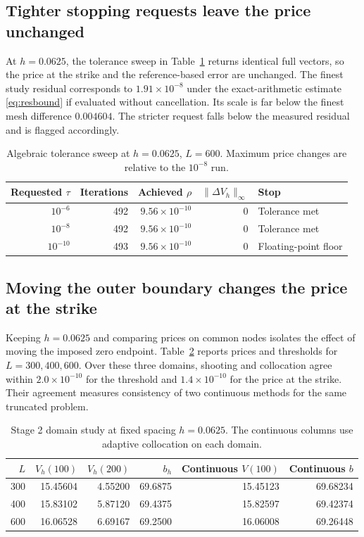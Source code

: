 \documentclass[11pt,a4paper]{article}
\numberwithin{equation}{section}
\begin{document}
\subsection{Tighter stopping requests leave the price unchanged}
At $h=0.0625$, the tolerance sweep in Table~\ref{tab:tolerance} returns
identical full vectors, so the price at the strike and the
reference-based error are unchanged. The finest study residual
corresponds to $1.91\times10^{-8}$ under the exact-arithmetic estimate
\eqref{eq:resbound} if evaluated without cancellation. Its scale is
far below the finest mesh difference $0.004604$.
The stricter request falls below the measured residual and is
flagged accordingly.

\begin{table}[htbp]
\centering\small
\caption{Algebraic tolerance sweep at $h=0.0625$, $L=600$.
Maximum price changes are relative to the $10^{-8}$ run.}
\label{tab:tolerance}
\begin{tabular}{@{}rrrrl@{}}
\toprule
Requested $\tau$ & Iterations & Achieved $\rho$ & $\|\Delta V_h\|_\infty$ & Stop\\
\midrule
$10^{-6}$ & 492 & $9.56\times10^{-10}$ & 0 & Tolerance met\\
$10^{-8}$ & 492 & $9.56\times10^{-10}$ & 0 & Tolerance met\\
$10^{-10}$ & 493 & $9.56\times10^{-10}$ & 0 & Floating-point floor\\
\bottomrule
\end{tabular}
\end{table}

\subsection{Moving the outer boundary changes the price at the strike}
Keeping $h=0.0625$ and comparing prices on common nodes isolates the
effect of moving the imposed zero endpoint. Table~\ref{tab:domain}
reports prices and thresholds for $L=300,400,600$. Over these three
domains, shooting and collocation agree within $2.0\times10^{-10}$
for the threshold and $1.4\times10^{-10}$ for the price at the strike.
Their agreement measures consistency of two continuous methods for
the same truncated problem.

\begin{table}[htbp]
\centering\small
\caption{Stage 2 domain study at fixed spacing $h=0.0625$.
The continuous columns use adaptive collocation on each domain.}
\label{tab:domain}
\begin{tabular}{@{}rrrrrr@{}}
\toprule
$L$ & $V_h(100)$ & $V_h(200)$ & $b_h$ & Continuous $V(100)$ & Continuous $b$\\
\midrule
300 & 15.45604 & 4.55200 & 69.6875 & 15.45123 & 69.68234\\
400 & 15.83102 & 5.87120 & 69.4375 & 15.82597 & 69.42374\\
600 & 16.06528 & 6.69167 & 69.2500 & 16.06008 & 69.26448\\
\bottomrule
\end{tabular}
\end{table}
\end{document}
